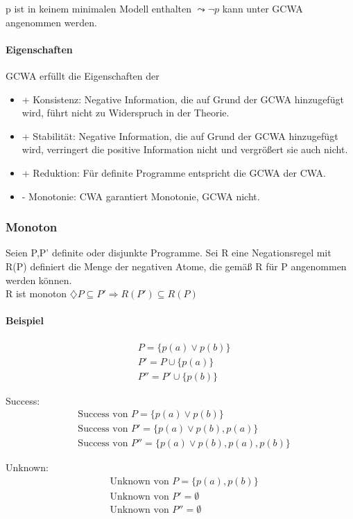 \documentclass[12pt, a4paper]{article}
\begin{document}
p ist in keinem minimalen Modell enthalten $\leadsto \lnot p$  kann unter GCWA angenommen werden.

\paragraph{Eigenschaften}
GCWA erfüllt die Eigenschaften der

\begin{itemize}
\item + Konsistenz: Negative Information, die auf Grund der GCWA hinzugefügt wird, führt nicht zu Widerspruch in der Theorie.
\item + Stabilität: Negative Information, die auf Grund der GCWA hinzugefügt wird, verringert die positive Information nicht und vergrößert sie auch nicht.
\item + Reduktion: Für definite Programme entspricht die GCWA der CWA. 
\item - Monotonie: CWA garantiert Monotonie, GCWA nicht.
\end{itemize}

\subsubsection*{Monoton}
Seien P,P' definite oder disjunkte Programme. Sei R eine Negationsregel mit R(P) definiert die Menge der negativen Atome, die gemäß R für P angenommen werden können. \\
R ist monoton $\diamondsuit P \subseteq P' \Rightarrow R(P') \subseteq R(P)$  

\paragraph{Beispiel}

\begin{align*}
&P =  \{ p(a) \vee p(b) \} \\
&P' = P \cup \{ p(a) \} \\
&P'' = P' \cup \{ p(b) \}
\end{align*}

Success:
\begin{align*}
&\text{Success von }P =  \{ p(a) \vee p(b) \} \\
&\text{Success von }P' = \{ p(a) \vee p(b), p(a) \} \\
&\text{Success von }P'' = \{ p(a) \vee p(b), p(a), p(b) \}
\end{align*}

Unknown:
\begin{align*}
&\text{Unknown von }P =  \{ p(a), p(b) \} \\
&\text{Unknown von }P' = \emptyset \\
&\text{Unknown von }P'' = \emptyset
\end{align*}
\end{document}
